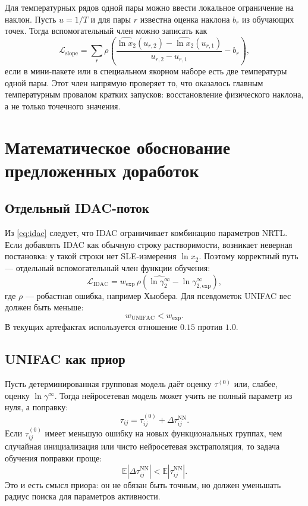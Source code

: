 \documentclass[11pt]{article}
\newcommand{\E}{\mathbb{E}}
\newcommand{\abs}[1]{\left\lvert #1 \right\rvert}
\theoremstyle{definition}
\begin{document}
Для температурных рядов одной пары можно ввести локальное ограничение на наклон. Пусть $u=1/T$ и для пары $r$ известна оценка наклона $b_r$ из обучающих точек. Тогда вспомогательный член можно записать как
\begin{equation*}
    \mathcal L_{\mathrm{slope}}
    = \sum_r \rho\!\left(
        \frac{\widehat{\ln x_2}(u_{r,2})-\widehat{\ln x_2}(u_{r,1})}
             {u_{r,2}-u_{r,1}}
        - b_r
    \right),
\end{equation*}
если в мини-пакете или в специальном якорном наборе есть две температуры одной пары. Этот член напрямую проверяет то, что оказалось главным температурным провалом кратких запусков: восстановление физического наклона, а не только точечного значения.

\section{Математическое обоснование предложенных доработок}
\label{app:improvements}

\subsection{Отдельный IDAC-поток}

Из \eqref{eq:idac} следует, что IDAC ограничивает комбинацию параметров NRTL. Если добавлять IDAC как обычную строку растворимости, возникает неверная постановка: у такой строки нет SLE-измерения $\ln x_2$. Поэтому корректный путь --- отдельный вспомогательный член функции обучения:
\begin{equation*}
    \mathcal L_{\mathrm{IDAC}}
    = w_{\mathrm{exp}}\,\rho\!
    \left(\widehat{\ln\gamma_2^{\infty}}-\ln\gamma_{2,\mathrm{exp}}^{\infty}\right),
\end{equation*}
где $\rho$ --- робастная ошибка, например Хьюбера. Для псевдометок UNIFAC вес должен быть меньше:
\begin{equation*}
    w_{\mathrm{UNIFAC}}<w_{\mathrm{exp}}.
\end{equation*}
В текущих артефактах используется отношение $0.15$ против $1.0$.

\subsection{UNIFAC как приор}

Пусть детерминированная групповая модель даёт оценку $\tau^{(0)}$ или, слабее, оценку $\ln\gamma^\infty$. Тогда нейросетевая модель может учить не полный параметр из нуля, а поправку:
\begin{equation*}
    \tau_{ij}=\tau_{ij}^{(0)}+\Delta\tau_{ij}^{\mathrm{NN}}.
\end{equation*}
Если $\tau_{ij}^{(0)}$ имеет меньшую ошибку на новых функциональных группах, чем случайная инициализация или чисто нейросетевая экстраполяция, то задача обучения поправки проще:
\begin{equation*}
    \E\abs{\Delta\tau_{ij}^{\mathrm{NN}}}
    < \E\abs{\tau_{ij}^{\mathrm{NN}}}.
\end{equation*}
Это и есть смысл приора: он не обязан быть точным, но должен уменьшать радиус поиска для параметров активности.
\end{document}
